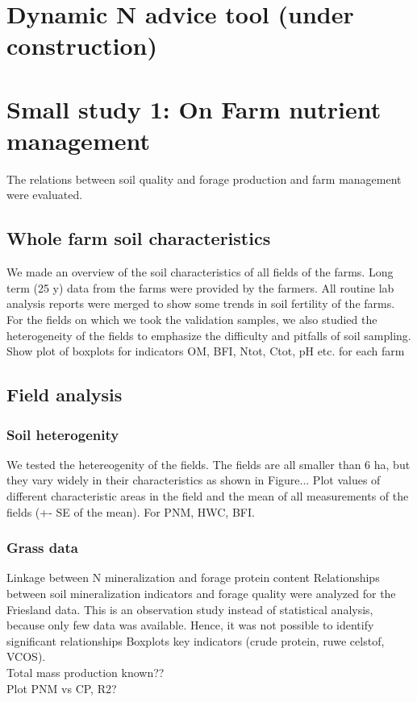 \documentclass[10pt,twoside,dutch,english]{report}
\begin{document}
\begin{appendices}
\chapter{Dynamic N advice tool (under construction)}
\label{chap: dynN}

\chapter{Small study 1: On Farm nutrient management}
		\label{chap: study1}
		The relations between soil quality and forage production and farm management were evaluated. 
			\section{Whole farm soil characteristics}
	We made an overview of the soil characteristics of all fields of the farms. Long term (25 y) data from the farms were provided by the farmers. All routine lab analysis reports were merged to show some trends in  soil fertility of the farms. For the fields on which we took the validation samples, we also studied the heterogeneity of the fields to emphasize the difficulty and pitfalls of soil sampling. 
	Show plot of boxplots for indicators OM, BFI, Ntot, Ctot, pH etc. for each farm
	
			\section{Field analysis}
		
			\subsection{Soil heterogenity}
			We tested the hetereogenity of the fields. The fields are all smaller than 6 ha, but they vary widely in their characteristics as shown in Figure...
			Plot values of different characteristic areas in the field and the mean of all measurements of the fields (+- SE of the mean). For PNM, HWC, BFI.
			\subsection{Grass data}
			Linkage between N mineralization and forage protein content
	Relationships between soil mineralization indicators and forage quality were analyzed for the Friesland data.  This is an observation study instead of statistical analysis, because only few data was available. Hence, it was not possible to identify significant relationships
	Boxplots key indicators (crude protein, ruwe celstof, VCOS).\\
	Total mass production known??\\
	Plot PNM vs CP, R2?


\end{appendices}
\end{document}
